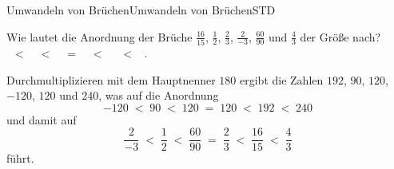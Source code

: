 \begin{MXContent}{Umwandeln von Brüchen}{Umwandeln von Brüchen}{STD}
\begin{MExercise}
Wie lautet die Anordnung der Brüche $\frac{16}{15}$, $\frac12$, $\frac23$, $\frac2{-3}$, $\frac{60}{90}$ und $\frac43$ der Größe nach?
\ \\
\ $<$\ 
\ $<$\ 
\ $=$\ 
\ $<$\ 
 \ $<$\ 
 .
\ \\
\begin{MHint}{\iSolution}
Durchmultiplizieren mit dem Hauptnenner $180$ ergibt die Zahlen $192$, $90$, $120$, $-120$, $120$ und $240$, was auf die Anordnung
$$
-120\; < \; 90 \; < \; 120 \; = \; 120\; < \; 192 \; < \; 240
$$
und damit auf
$$
\frac2{-3} \; < \; \frac12 \;<\; \frac{60}{90} \; =\; \frac23\; < \; \frac{16}{15} \; < \; \frac{4}{3}
$$
führt.
\end{MHint}
\end{MExercise}

\end{MXContent}

